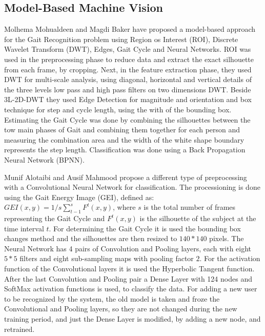 \documentclass[12pt]{article}
\theoremstyle{definition}
\begin{document}
	\subsection{Model-Based Machine Vision}

	Molhema Mohualdeen and Magdi Baker \cite{gait-silhouette-nn} have proposed a model-based approach for the Gait Recognition problem using Region os Interest (ROI), Discrete Wavelet Transform (DWT), Edges, Gait Cycle and Neural Networks.
	ROI was used in the preprocessing phase to reduce data and extract the exact silhouette from each frame, by cropping. Next, in the feature extraction phase, they used DWT for multi-scale analysis, using diagonal, horizontal and vertical details of the three levels low pass and high pass filters on two dimensions DWT. Beside 3L-2D-DWT they used Edge Detection for magnitude and orientation and box technique for step and cycle length, using the with of the bounding box. Estimating the Gait Cycle was done by combining the silhouettes between the tow main phases of Gait and combining them together for each person and measuring the combination area and the width of the white shape boundary represents the step length. Classification was done using a Back Propagation Neural Network (BPNN).

	Munif Alotaibi and Ausif Mahmood \cite{gait-with-gei} propose a different type of preprocessing with a Convolutional Neural Network for classification. The processioning is done using the Gait Energy Image (GEI), defined as: $GEI(x, y)=1/s\sum_{t-1}^{s}F^t(x, y)$, where $s$ is the total number of frames representing the Gait Cycle and $F^t(x, y)$ is the silhouette of the subject at the time interval $t$. For determining the Gait Cycle it is used the bounding box changes method and the silhouettes are then resized to $140 * 140$ pixels. The Neural Network has 4 pairs of Convolution and Pooling layers, each with eight $5 * 5$ filters and eight sub-sampling maps with pooling factor $2$. For the activation function of the Convolutional layers it is used the Hyperbolic Tangent function. After the last Convolution and Pooling pair a Dense Layer with 124 nodes and SoftMax activation functions is used, to classify the data. For adding a new user to be recognized by the system, the old model is taken and froze the Convolutional and Pooling layers, so they are not changed during the new training period, and just the Dense Layer is modified, by adding a new node, and retrained.
\end{document}
